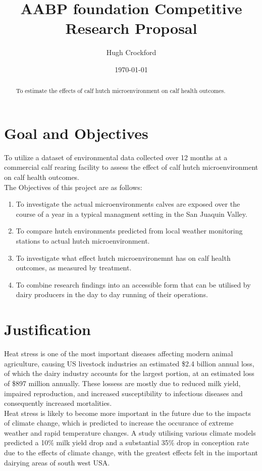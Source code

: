 \documentclass[12pt]{article}
\title{AABP foundation Competitive Research Proposal}
\author{Hugh Crockford}
\date{\today}
\begin{document}
	\maketitle
	\tableofcontents
	
	\newpage
	\begin{abstract}
		To estimate the effects of calf hutch microenvironment on calf health outcomes.
	\end{abstract}
	\section{Goal and Objectives}
	To utilize a dataset of environmental data collected over 12 months at a commercial calf rearing facility to assess the effect of calf hutch microenvironment on calf health outcomes.\\


	The Objectives of this project are as follows:
	\begin{enumerate}
		\item To investigate the actual microenvironments calves are exposed over the course of a year in a typical managment setting in the San Juaquin Valley.
		\item To compare hutch environments predicted from local weather monitoring stations to actual hutch microenvironment.
		\item To investigate what effect hutch microenvironemnt has on calf health outcomes, as measured by treatment.
		\item To combine research findings into an accessible form that can be utilised by dairy producers in the day to day running of their operations.
	\end{enumerate}


	\newpage
	\section{Justification}
	Heat stress is one of the most important diseases affecting modern animal agriculture, causing US livestock industries an estimated \$2.4 billion annual loss, of which the dairy industry accounts for the largest portion, at an estimated loss of \$897 million annually\cite{St-Pierre2003}. 
	These lossess are mostly due to reduced milk yield, impaired reproduction, and increased susceptibility to infectious diseases and consequently increased mortalities.\cite{Kadzere2002,Hammami2013}\\
	Heat stress is likely to become more important in the future due to the impacts of climate change, which is predicted to increase the occurance of extreme weather and rapid temperature changes\cite{Parry2007}. A study utilising various climate models predicted a 10\% milk yield drop and a substantial 35\% drop in conception rate due to the effects of climate change, with the greatest effects felt in the important dairying areas of south west USA\cite{Klinedinst1993}.\\
\end{document}

